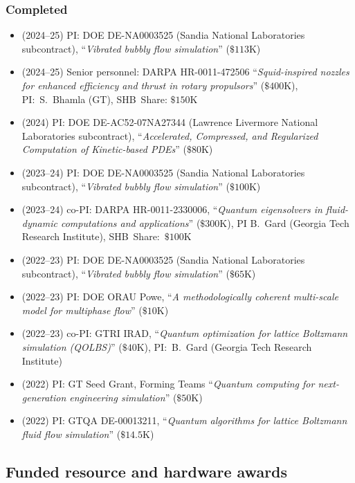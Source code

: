 \subsubsection{Completed}

\begin{itemize}
    \item (2024--25) PI: DOE DE-NA0003525 (Sandia National Laboratories subcontract), ``\textit{Vibrated bubbly flow simulation}'' ($\$113$K)
    \item (2024--25) Senior personnel: DARPA HR-0011-472506 ``\textit{Squid-inspired nozzles for enhanced  efficiency and thrust in rotary propulsors}'' ($\$400$K), PI:~S.~Bhamla (GT), SHB~Share: $\$150$K
    \item (2024) PI: DOE DE-AC52-07NA27344 (Lawrence Livermore National Laboratories subcontract), ``\textit{Accelerated, Compressed, and Regularized Computation of Kinetic-based PDEs}'' ($\$80$K)
    \item (2023--24) PI: DOE DE-NA0003525 (Sandia National Laboratories subcontract), ``\textit{Vibrated bubbly flow simulation}'' ($\$100$K)
    \item (2023--24) co-PI: DARPA HR-0011-2330006, ``\textit{Quantum eigensolvers in fluid-dynamic computations and applications}'' ($\$300$K), PI B.~Gard (Georgia Tech Research Institute), SHB~Share:~$\$100$K
    \item (2022--23) PI: DOE DE-NA0003525 (Sandia National Laboratories subcontract), ``\textit{Vibrated bubbly flow simulation}'' ($\$65$K)
    \item (2022--23) PI: DOE ORAU Powe, ``\textit{A methodologically coherent multi-scale model for multiphase flow}'' ($\$10$K)
    \item (2022--23) co-PI: GTRI IRAD, ``\textit{Quantum optimization for lattice Boltzmann simulation (QOLBS)}'' ($\$40$K), PI:~B.~Gard (Georgia Tech Research Institute)
    \item (2022) PI: GT Seed Grant, Forming Teams ``\textit{Quantum computing for next-generation engineering simulation}'' ($\$50$K)
    \item (2022) PI: GTQA DE-00013211, ``\textit{Quantum algorithms for lattice Boltzmann fluid flow simulation}'' ($\$14.5$K)
\end{itemize}

\subsection{Funded resource and hardware awards}

